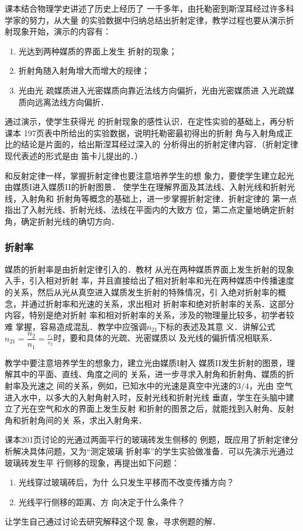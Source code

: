 课本结合物理学史讲述了历史上经历了
一千多年，由托勒密到斯涅耳经过许多科学家的努力，从大量
的实验数据中归纳总结出折射定律，教学过程也要从演示折
射现象开始，演示的内容有：
\begin{enumerate}
\item 光达到两种媒质的界面上发生
折射的现象；
\item 折射角随入射角增大而增大的规律；
\item 光由光
疏媒质进入光密媒质向靠近法线方向偏折，光由光密媒质进
入光疏媒质向远离法线方向偏折．
\end{enumerate}
通过演示，使学生获得光
的折射现象的感性认识．在定性实验的基础上，再分析课本
197页表中所给出的实验数据，说明托勒密最初得出的折射
角与入射角成正比的结论是片面的，给出斯涅耳经过深入的
分析得出的折射定律内容．（折射定律现代表述的形式是由
笛卡儿提出的．）

和反射定律一样，掌握折射定律也要注意培养学生的想
象力，要使学生建立起光由媒质I进入媒质II的折射图景．
使学生在理解界面及其法线、入射光线和折射光线，入射角和
折射角等概念的基础上，进一步掌握折射定律．折射定律的
第一点指出了入射光线、折射光线、法线在平面内的大致方
位，第二点定量地确定折射角，确定折射光线的确切方向．

\subsubsection{折射率}

媒质的折射率是由折射定律引入的．教材
从光在两种媒质界面上发生折射的现象入手，引入相对折射
率，并且直接给出了相对折射率和光在两种媒质中传播速度
的关系，然后从光从真空进入媒质发生折射的特殊情况，引
入绝对折射率的概念，并通过折射率和光速的关系，求出相对
折射率和绝对折射率的关系．这部分内容，特别是绝对折射
率和相对折射率的关系，涉及的物理量比较多，初学者较难
掌握，容易造成混乱．教学中应强调$n_{21}$下标的表述及其意
义．讲解公式$n_{21}=\dfrac{n_2}{n_1}=\frac{v_1}{v_2}$时，要和具体的光疏、光密媒质以
及光线的偏折情况相联系．

教学中要注意培养学生的想象力，建立光由媒质I射入
媒质II发生折射的图景，理解其中的平面、直线、角度之间的
关系，进一步寻求入射角和折射角、媒质的折射率及光速之
间的关系，例如，已知水中的光速是真空中光速的$3/4$，光由
空气进入水中，以多大的入射角射入时，反射光线和折射光线
垂直，学生在头脑中建立了光在空气和水的界面上发生反射
和折射的图景之后，就能找到入射角、反射角和折射角间的关
系，求出入射角来．

课本201页讨论的光通过两面平行的玻璃砖发生侧移的
例题，既应用了折射定律分析解决具体问题，又为“测定玻璃
折射率”的学生实验做准备．可以先演示光通过玻璃砖发生平
行侧移的现象，再提出如下问题：
\begin{enumerate}
\item 光线穿过玻璃砖后，为什
么只发生平移而不改变传播方向？
\item 光线平行侧移的距离、方
向决定于什么条件？
\end{enumerate}
让学生自己通过讨论去研究解释这个现
象，寻求例题的解．

